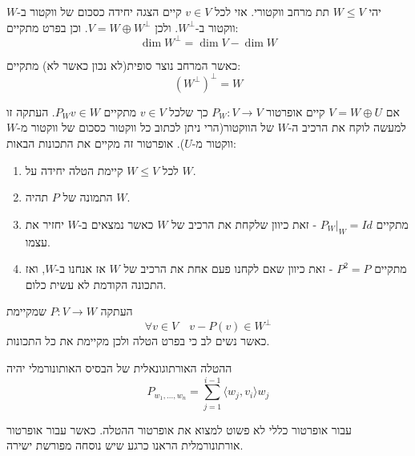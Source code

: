 \documentclass{tstextbook}
\begin{document}
\begin{proposition}
יהי \(W \leq V\) תת מרחב ווקטורי. אזי לכל \(v \in V\) קיים הצגה יחידה כסכום של ווקטור ב-\(W\) ווקטור ב-\(W^{\perp}\). ולכן \(V=W\oplus W^{\perp}\). וכן בפרט מתקיים:
$$\dim W^{\perp}=\dim  V-\dim  W$$

\end{proposition}
\begin{proposition}
כאשר המרחב נוצר סופית(לא נכון כאשר לא) מתקיים:
$$\left( W^{\perp} \right)^{\perp}=W$$

\end{proposition}
\begin{reminder}
אם \(V=W\oplus U\) קיים אופרטור \(P_{W}:V\to V\) כך שלכל \(v\in V\) מתקיים \(P_{W}v \in W\). העתקה זו למעשה לוקח את הרכיב ה-\(W\) של הווקטור(הרי ניתן לכתוב כל ווקטור כסכום של ווקטור מ-\(W\) ווקטור מ-\(U\)). אופרטור זה מקיים את התכונות הבאות:

\end{reminder}
\begin{enumerate}
  \item לכל \(W\leq V\) קיימת הטלה יחידה על \(W\). 


  \item התמונה של \(P\) תהיה \(W\). 


  \item מתקיים \(P_{W}|_{W}=Id\) - זאת כיוון שלקחת את הרכיב של \(W\) כאשר נמצאים ב-\(W\) יחזיר את עצמו. 


  \item מתקיים \(P^{2}=P\) - זאת כיוון שאם לקחנו פעם אחת את הרכיב של \(W\) אז אנחנו ב-\(W\), ואז התכונה הקודמת לא עשית כלום. 


\end{enumerate}
\begin{definition}
העתקה \(P:V\rightarrow W\) שמקיימת
$$\forall v\in V\quad v-P(v) \in W^\perp$$
כאשר נשים לב כי בפרט הטלה ולכן מקיימת את כל התכונות.

\end{definition}
\begin{proposition}
ההטלה האורתוגונאלית של הבסיס האותונורמלי יהיה $$P_{w_1,...,w_n}=\sum_{j=1}^{i-1}\langle  w_j, v_i \rangle w_j$$

\end{proposition}
\begin{remark}
עבור אופרטור כללי לא פשוט למצוא את אופרטור ההטלה. כאשר עבור אופרטור אורתונורמלית הראנו כרגע שיש נוסחה מפורשת ישירה.

\end{remark}
\end{document}
